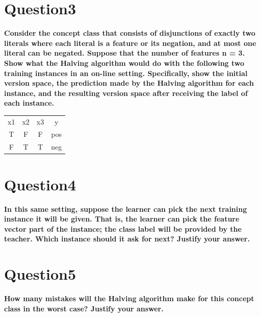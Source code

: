 \documentclass[paper=a4, fontsize=11pt]{scrartcl} %
\numberwithin{equation}{section} %
\numberwithin{figure}{section} %
\numberwithin{table}{section} %
\begin{document}
\newpage
\section*{Question3}
\textbf{Consider the concept class that consists of disjunctions of exactly two literals where each literal is a feature or its negation, and at most one literal can be negated. Suppose that the number of features n = 3. Show what the Halving algorithm would do with the following two training instances in an on-line setting. Specifically, show the initial version space, the prediction made by the Halving algorithm for each instance, and the resulting version space after receiving the label of each instance.}

\begin{center}
\begin{tabular}{ c c c c}
 x1 & x2 & x3 & y \\ 
 T & F & F & pos \\  
 F & T & T & neg \\  
\end{tabular}
\end{center}





\newpage
\section*{Question4}
\textbf{In this same setting, suppose the learner can pick the next training instance it will be given. That is, the learner can pick the feature vector part of the instance; the class label will be provided by the teacher. Which instance should it ask for next? Justify your answer.}




\newpage
\section*{Question5}
\textbf{How many mistakes will the Halving algorithm make for this concept class in the worst case? Justify your answer.}




\newpage
\end{document}

